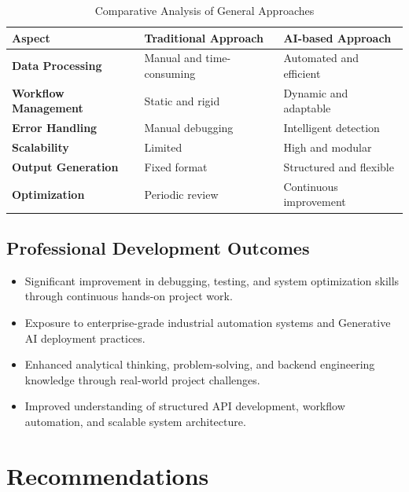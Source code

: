 \documentclass[12pt,a4paper]{report}
\begin{document}
\begin{table}[H]
\centering
\caption{Comparative Analysis of General Approaches}
\begin{tabular}{>{\bfseries}p{4cm} p{4cm} p{4cm}}
\toprule
\textbf{Aspect} & \textbf{Traditional Approach} & \textbf{AI-based Approach} \\
\midrule
Data Processing & Manual and time-consuming & Automated and efficient \\
Workflow Management & Static and rigid & Dynamic and adaptable \\
Error Handling & Manual debugging & Intelligent detection \\
Scalability & Limited & High and modular \\
Output Generation & Fixed format & Structured and flexible \\
Optimization & Periodic review & Continuous improvement \\
\bottomrule
\end{tabular}
\label{tab:comparative}
\end{table}

\subsection{Professional Development Outcomes}

\begin{itemize}[leftmargin=1.5cm]
    \item Significant improvement in debugging, testing, and system optimization skills through continuous hands-on project work.
    \item Exposure to enterprise-grade industrial automation systems and Generative AI deployment practices.
    \item Enhanced analytical thinking, problem-solving, and backend engineering knowledge through real-world project challenges.
    \item Improved understanding of structured API development, workflow automation, and scalable system architecture.
\end{itemize}

\section{Recommendations}
\end{document}
